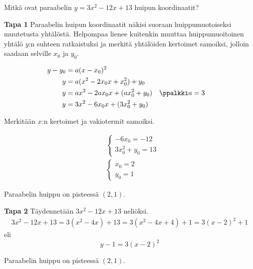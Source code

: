 \begin{esimerkki}
	Mitkä ovat paraabelin $y=3x^2-12x+13$ huipun koordinaatit?
	\begin{esimratk} \textbf{Tapa 1}
		Paraabelin huipun koordinaatit näkisi suoraan huippumuotoiseksi muutetusta yhtälöstä. Helpompaa lienee kuitenkin muuttaa huippumuoitoinen yhtälö $y$:n suhteen ratkaistuksi ja merkitä yhtälöiden kertoimet samoiksi, jolloin saadaan selville $x_0$ ja $y_0$.

		\begin{align*}
			y-y_0	&= a(x-x_0)^2 \\
			y       &= a(x^2-2x_0x+x_0^2)+y_0\\
			y       &= ax^2-2ax_0x+(ax_0^2+y_0) &&\ppalkki a=3\\
			y       &= 3x^2-6x_0x+(3x_0^2+y_0)
		\end{align*}

		Merkitään $x$:n kertoimet ja vakiotermit samoiksi.

		\begin{align*}
			&\begin{cases}
				-6x_0=-12 \\
				3x_0^2+y_0 =13
			\end{cases}\\
			&\begin{cases}
				x_0=2 \\
				y_0 =1
			\end{cases}
		\end{align*}
		\begin{esimvast}
			Paraabelin huippu on pisteessä $(2, 1)$.
		\end{esimvast}

		\begin{esimratk} \textbf{Tapa 2}
			Täydennetään $3x^2-12x+13$ neliöksi.
			\begin{align*}
				3x^2-12x+13 = 3(x^2-4x)+13 = 3(x^2-4x+4)+1 = 3(x-2)^2+1
			\end{align*}
			eli
			\[ y-1 = 3(x-2)^2 \]
			\begin{esimvast}
			Paraabelin huippu on pisteessä $(2, 1)$.
\end{esimvast}
\end{esimratk}



\end{esimratk}
\end{esimerkki}

